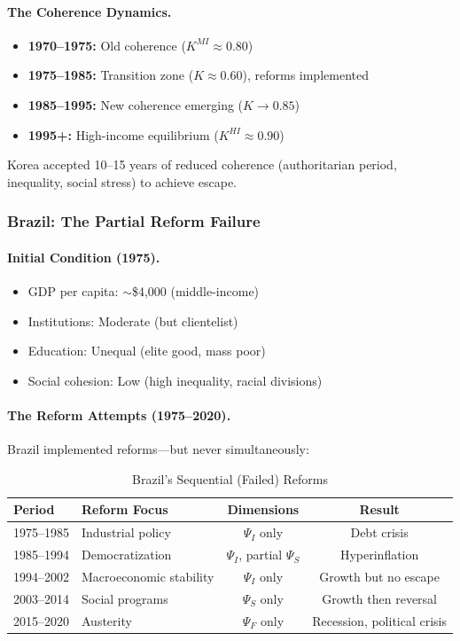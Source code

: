 \paragraph{The Coherence Dynamics.}
\begin{itemize}
    \item \textbf{1970--1975:} Old coherence ($K^{MI} \approx 0.80$)
    \item \textbf{1975--1985:} Transition zone ($K \approx 0.60$), reforms implemented
    \item \textbf{1985--1995:} New coherence emerging ($K \to 0.85$)
    \item \textbf{1995+:} High-income equilibrium ($K^{HI} \approx 0.90$)
\end{itemize}

Korea accepted 10--15 years of reduced coherence (authoritarian period, 
inequality, social stress) to achieve escape.

\subsubsection{Brazil: The Partial Reform Failure}

\paragraph{Initial Condition (1975).}
\begin{itemize}
    \item GDP per capita: $\sim$\$4,000 (middle-income)
    \item Institutions: Moderate (but clientelist)
    \item Education: Unequal (elite good, mass poor)
    \item Social cohesion: Low (high inequality, racial divisions)
\end{itemize}

\paragraph{The Reform Attempts (1975--2020).}
Brazil implemented reforms---but never simultaneously:

\begin{table}[htbp]
\centering
\caption{Brazil's Sequential (Failed) Reforms}
\label{tab:brazil-reforms}
\begin{tabular}{@{}llcc@{}}
\toprule
\textbf{Period} & \textbf{Reform Focus} & \textbf{Dimensions} & \textbf{Result} \\
\midrule
1975--1985 & Industrial policy & $\Psi_I$ only & Debt crisis \\
1985--1994 & Democratization & $\Psi_I$, partial $\Psi_S$ & Hyperinflation \\
1994--2002 & Macroeconomic stability & $\Psi_I$ only & Growth but no escape \\
2003--2014 & Social programs & $\Psi_S$ only & Growth then reversal \\
2015--2020 & Austerity & $\Psi_F$ only & Recession, political crisis \\
\bottomrule
\end{tabular}
\end{table}

